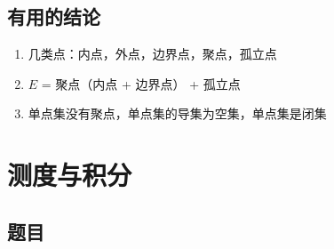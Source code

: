 \documentclass{article}
\begin{document}
\subsection{有用的结论}
\begin{enumerate}
    \item 几类点：内点，外点，边界点，聚点，孤立点
    \item $E$ = 聚点（内点 + 边界点） + 孤立点
    
    \item 单点集没有聚点，单点集的导集为空集，单点集是闭集
\end{enumerate}

\section{测度与积分}
\subsection{题目}
\end{document}
